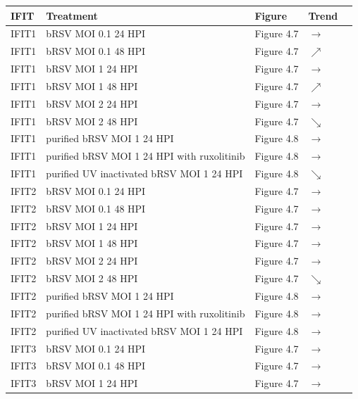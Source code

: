 \begin{table}
    \centering
    \begin{tabular}{lllll}
    \hline
	\textbf{IFIT} & \textbf{Treatment} & \textbf{Figure} & \textbf{Trend} \\ \hline
        IFIT1 & bRSV MOI 0.1 24 HPI & Figure 4.7 & \(\rightarrow\) \\
        IFIT1 & bRSV MOI 0.1 48 HPI & Figure 4.7 & \(\nearrow\) \\ 
        IFIT1 & bRSV MOI 1 24 HPI & Figure 4.7 & \(\rightarrow\) \\ 
        IFIT1 & bRSV MOI 1 48 HPI & Figure 4.7 & \(\nearrow\) \\ 
        IFIT1 & bRSV MOI 2 24 HPI & Figure 4.7 & \(\rightarrow\) \\ 
        IFIT1 & bRSV MOI 2 48 HPI & Figure 4.7 & \(\searrow\) \\ 
        IFIT1 & purified bRSV MOI 1 24 HPI & Figure 4.8 & \(\rightarrow\) \\ 
        IFIT1 & purified bRSV MOI 1 24 HPI with ruxolitinib & Figure 4.8 & \(\rightarrow\) \\ 
        IFIT1 & purified UV inactivated bRSV MOI 1 24 HPI & Figure 4.8 & \(\searrow\) \\ 
        IFIT2 & bRSV MOI 0.1 24 HPI & Figure 4.7 & \(\rightarrow\) \\ 
        IFIT2 & bRSV MOI 0.1 48 HPI & Figure 4.7 & \(\rightarrow\) \\ 
        IFIT2 & bRSV MOI 1 24 HPI & Figure 4.7 & \(\rightarrow\) \\ 
        IFIT2 & bRSV MOI 1 48 HPI & Figure 4.7 & \(\rightarrow\) \\ 
        IFIT2 & bRSV MOI 2 24 HPI & Figure 4.7 & \(\rightarrow\) \\ 
        IFIT2 & bRSV MOI 2 48 HPI & Figure 4.7 & \(\searrow\) \\ 
        IFIT2 & purified bRSV MOI 1 24 HPI & Figure 4.8 & \(\rightarrow\) \\ 
        IFIT2 & purified bRSV MOI 1 24 HPI with ruxolitinib & Figure 4.8 & \(\rightarrow\) \\ 
        IFIT2 & purified UV inactivated bRSV MOI 1 24 HPI & Figure 4.8 & \(\rightarrow\) \\ 
        IFIT3 & bRSV MOI 0.1 24 HPI & Figure 4.7 & \(\rightarrow\) \\ 
        IFIT3 & bRSV MOI 0.1 48 HPI & Figure 4.7 & \(\rightarrow\) \\ 
        IFIT3 & bRSV MOI 1 24 HPI & Figure 4.7 & \(\rightarrow\) \\ 

\end{tabular}
\end{table}
